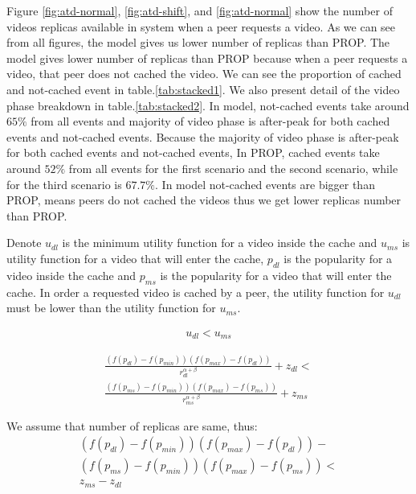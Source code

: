 \documentclass[10pt,final,journal,a4paper]{IEEEtran}
\begin{document}
Figure \ref{fig:atd-normal}, \ref{fig:atd-shift}, and \ref{fig:atd-normal} show the number of  videos replicas available in system when a peer requests a video.
As we can see from all figures, the model gives us lower number of replicas than PROP.
The model gives lower number of replicas than PROP because when a peer requests a video, that peer does not cached the video.
We can see the proportion of cached and not-cached event in table.\ref{tab:stacked1}. 
We also present detail of the video phase breakdown in table.\ref{tab:stacked2}.
In model, not-cached events take around $65\%$ from all events and majority of video phase is  after-peak for both cached events and not-cached events. 
Because the majority of video phase is  after-peak for both cached events and not-cached events, 
In PROP, cached events take around $52\%$ from all events for the first scenario and the second scenario, while for the third scenario is $67.7\%$.
In model not-cached events are bigger than PROP, means peers do not cached the videos thus we get lower replicas number than PROP.


Denote $u_{dl}$ is the minimum utility function for a video inside the cache and $u_{ms}$ is utility function for a video that will enter the cache,  $p_{dl}$ is the popularity for a video inside the cache and $p_{ms}$ is the popularity for a video that will enter the cache.
In order a requested video is cached by a peer, the utility function for $u_{dl}$ must be lower than the utility function for $u_{ms}$.

\begin{align}\label{eq:dlms_1}
u_{dl} < u_{ms}
\end{align}

\begin{multline}\label{eq:dlms_2}
\frac{ (f(p_{dl}) - f(p_{min})) (f(p_{max}) - f(p_{dl})) }{r^{\alpha + \beta}_{dl}} + z_{dl} < \\
\frac{ (f(p_{ms}) - f(p_{min})) (f(p_{max}) - f(p_{ms})) }{r^{\alpha + \beta}_{ms}} + z_{ms}
\end{multline}

We assume that number of replicas are same, thus:
\begin{multline}\label{eq:dlms_3}
(f(p_{dl}) - f(p_{min})) (f(p_{max}) - f(p_{dl})) - \\ 
(f(p_{ms}) - f(p_{min})) (f(p_{max}) - f(p_{ms})) < \\
z_{ms} - z_{dl}
\end{multline}
\end{document}
